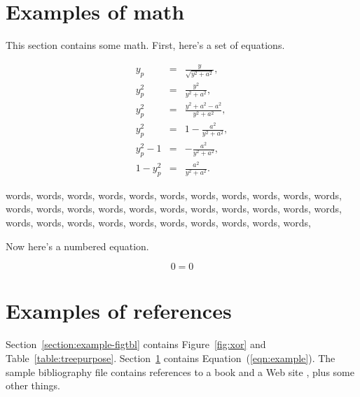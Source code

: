 \section{Examples of math}
\label{section:example-math}

This section contains some math.
First, here's a set of equations.

\begin{eqnarray*}
y_p	&	=	&	\frac{y}{\sqrt{y^2+a^2}}, \\
y_p^2	&	=	&	\frac{y^2}{y^2+a^2}, \\
y_p^2	&	=	&	\frac{y^2+a^2-a^2}{y^2+a^2}, \\
y_p^2	&	=	&	1-\frac{a^2}{y^2+a^2}, \\
y_p^2-1	&	=	&	-\frac{a^2}{y^2+a^2}, \\
1-y_p^2	&	=	&	\frac{a^2}{y^2+a^2}.
\end{eqnarray*}

words, words, words, words,
words, words, words, words,
words, words, words, words,
words, words, words, words,
words, words, words, words,
words, words, words, words,
words, words, words, words,
words, words, words, words,

Now here's a numbered equation.

\begin{equation}
0 = 0 \label{eqn:example}
\end{equation}

\section{Examples of references}

Section~\ref{section:example-figtbl} contains 
Figure~\ref{fig:xor} and
Table~\ref{table:treepurpose}.
Section~\ref{section:example-math} contains
Equation~(\ref{eqn:example}).
The sample bibliography file contains references to
a book \cite{gof-book} and a Web site \cite{MPI2}, plus some
other things.
\nocite{Dijkstra80}
\nocite{plop03-paper}
